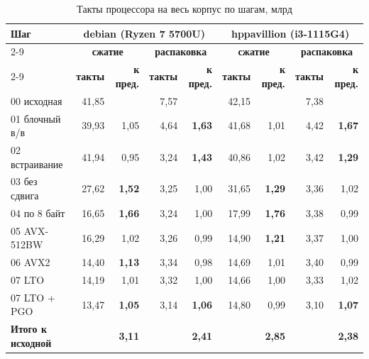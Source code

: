 \begin{table}[H]
\caption{Такты процессора на весь корпус по шагам, млрд}
\label{tab:final-cycles}
\begin{tabletext}
\centering
\setlength{\tabcolsep}{4pt}
\begin{tabular}{|l|r|r|r|r|r|r|r|r|}
\hline
\multirow{3}{*}{\textbf{Шаг}} & \multicolumn{4}{c|}{\textbf{debian (Ryzen 7 5700U)}} & \multicolumn{4}{c|}{\textbf{hppavillion (i3-1115G4)}} \\
\cline{2-9}
 & \multicolumn{2}{c|}{\textbf{сжатие}} & \multicolumn{2}{c|}{\textbf{распаковка}} & \multicolumn{2}{c|}{\textbf{сжатие}} & \multicolumn{2}{c|}{\textbf{распаковка}} \\
\cline{2-9}
 & \textbf{такты} & \textbf{к пред.} & \textbf{такты} & \textbf{к пред.} & \textbf{такты} & \textbf{к пред.} & \textbf{такты} & \textbf{к пред.} \\
\hline
00 исходная & 41,85 & & 7,57 & & 42,15 & & 7,38 & \\
01 блочный в/в & 39,93 & 1,05 & 4,64 & \textbf{1,63} & 41,68 & 1,01 & 4,42 & \textbf{1,67} \\
02 встраивание & 41,94 & 0,95 & 3,24 & \textbf{1,43} & 40,86 & 1,02 & 3,42 & \textbf{1,29} \\
03 без сдвига & 27,62 & \textbf{1,52} & 3,25 & 1,00 & 31,65 & \textbf{1,29} & 3,36 & 1,02 \\
04 по 8 байт & 16,65 & \textbf{1,66} & 3,24 & 1,00 & 17,99 & \textbf{1,76} & 3,38 & 0,99 \\
05 AVX-512BW & 16,29 & 1,02 & 3,26 & 0,99 & 14,90 & \textbf{1,21} & 3,37 & 1,00 \\
06 AVX2 & 14,40 & \textbf{1,13} & 3,34 & 0,98 & 14,69 & 1,01 & 3,40 & 0,99 \\
07 LTO & 14,19 & 1,01 & 3,32 & 1,00 & 14,66 & 1,00 & 3,33 & 1,02 \\
07 LTO + PGO & 13,47 & \textbf{1,05} & 3,14 & \textbf{1,06} & 14,80 & 0,99 & 3,10 & \textbf{1,07} \\
\hline
\textbf{Итого к исходной} & & \textbf{3,11} & & \textbf{2,41} & & \textbf{2,85} & & \textbf{2,38} \\
\hline
\end{tabular}
\end{tabletext}
\end{table}

